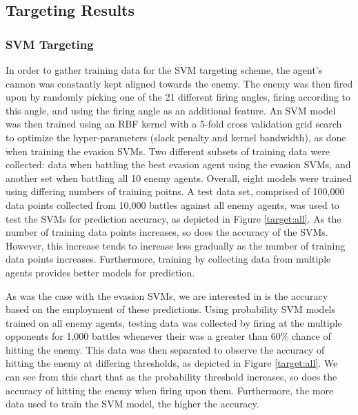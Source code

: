 \documentclass{article}
\theoremstyle{plain}
\theoremstyle{definition}
\theoremstyle{remark}
\begin{document}
\subsection*{Targeting Results}
\subsubsection*{SVM Targeting}
In order to gather training data for the SVM targeting scheme, the agent's cannon was constantly kept aligned towards the enemy. The enemy was then fired upon by randomly picking one of the 21 different firing angles, firing according to this angle, and using the firing angle as an additional feature. An SVM model was then trained using an RBF kernel with a 5-fold cross validation grid search to optimize the hyper-parameters (slack penalty and kernel bandwidth), as done when training the evasion SVMs. Two different subsets of training data were collected: data when battling the best evasion agent using the evasion SVMs, and another set when battling all 10 enemy agents. Overall, eight models were trained using differing numbers of training poitns. A test data set, comprised of 100,000 data points collected from 10,000 battles against all enemy agents, was used to test the SVMs for prediction accuracy, as depicted in Figure \ref{target:all}. As the number of training data points increases, so does the accuracy of the SVMs. However, this increase tends to increase less gradually as the number of training data points increases. Furthermore, training by collecting data from multiple agents provides better models for prediction. 

As was the case with the evasion SVMs, we are interested in is the accuracy based on the employment of these predictions. Using probability SVM models trained on all enemy agents, testing data was collected by firing at the multiple opponents for 1,000 battles whenever their was a greater than 60\% chance of hitting the enemy. This data was then separated to observe the accuracy of hitting the enemy at differing thresholds, as depicted in Figure \ref{target:all}. We can see from this chart that as the probability threshold increases, so does the accuracy of hitting the enemy when firing upon them. Furthermore, the more data used to train the SVM model, the higher the accuracy. 
\end{document}
